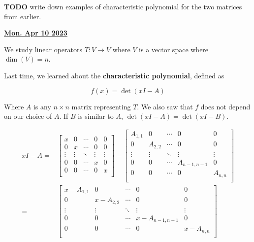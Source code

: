\documentclass[12pt]{article}
\renewcommand{\date}[1]{\underline{\bf #1}}
\newcommand{\TODO}{\color{red}\textbf{TODO}\color{black}}
\begin{document}
  \TODO{} write down examples of characteristic polynomial for the two matrices
  from earlier.


  \date{Mon. Apr 10 2023}


  We study linear operators $T: V \to V$ where $V$ is a vector space where
  $\dim(V) = n$.
  
  Last time, we learned about the {\bf characteristic polynomial}, defined as

  \[
    f(x) = \det(xI - A)
  \]

  Where $A$ is any $n \times n$ matrix representing $T$. We also saw that $f$
  does not depend on our choice of $A$. If $B$ is similar to $A$, $\det(xI - A)
  = \det(xI - B)$.

  \begin{align*}
    xI - A =&\begin{bmatrix}
      x & 0 & \cdots & 0 & 0 \\
      0 & x & \cdots & 0 & 0 \\
      \vdots & \vdots & \ddots & \vdots & \vdots \\
      0 & 0 & \cdots & x & 0 \\
      0 & 0 & \cdots & 0 & x \\
    \end{bmatrix}
    -
    \begin{bmatrix}
      A_{1,1} & 0 & \cdots & 0 & 0 \\
      0 & A_{2, 2} & \cdots & 0 & 0 \\
      \vdots & \vdots & \ddots & \vdots & \vdots \\
      0 & 0 & \cdots & A_{n - 1, n - 1} & 0 \\
      0 & 0 & \cdots & 0 & A_{n, n} \\
    \end{bmatrix} \\
      =&
    \begin{bmatrix}
      x - A_{1,1} & 0 & \cdots & 0 & 0 \\
      0 & x - A_{2, 2} & \cdots & 0 & 0 \\
      \vdots & \vdots & \ddots & \vdots & \vdots \\
      0 & 0 & \cdots & x - A_{n - 1, n - 1} & 0 \\
      0 & 0 & \cdots & 0 & x - A_{n, n} \\
    \end{bmatrix}
  \end{align*}
\end{document}
